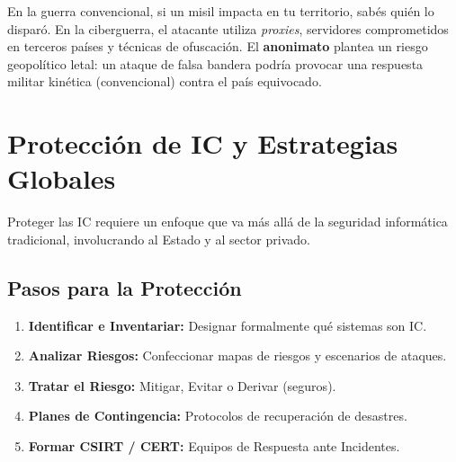 \documentclass[11pt,a4paper]{article}
\begin{document}
\begin{alerta}
En la guerra convencional, si un misil impacta en tu territorio, sabés quién lo disparó. En la ciberguerra, el atacante utiliza \textit{proxies}, servidores comprometidos en terceros países y técnicas de ofuscación. El \textbf{anonimato} plantea un riesgo geopolítico letal: un ataque de falsa bandera podría provocar una respuesta militar kinética (convencional) contra el país equivocado.
\end{alerta}

\section{Protección de IC y Estrategias Globales}
Proteger las IC requiere un enfoque que va más allá de la seguridad informática tradicional, involucrando al Estado y al sector privado.

\subsection{Pasos para la Protección}
\begin{enumerate}[leftmargin=*]
  \item \textbf{Identificar e Inventariar:} Designar formalmente qué sistemas son IC.
  \item \textbf{Analizar Riesgos:} Confeccionar mapas de riesgos y escenarios de ataques.
  \item \textbf{Tratar el Riesgo:} Mitigar, Evitar o Derivar (seguros).
  \item \textbf{Planes de Contingencia:} Protocolos de recuperación de desastres.
  \item \textbf{Formar CSIRT / CERT:} Equipos de Respuesta ante Incidentes.
\end{enumerate}
\end{document}

